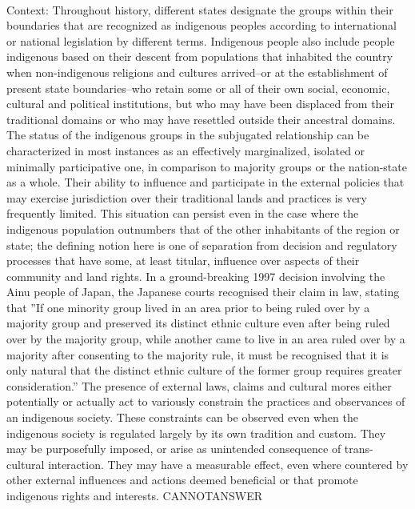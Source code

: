 \documentclass[11pt,a4paper, onecolumn]{article}
\begin{document}
\\ Context: Throughout history, different states designate the groups within their boundaries that are recognized as indigenous peoples according to international or national legislation by different terms. Indigenous people also include people indigenous based on their descent from populations that inhabited the country when non-indigenous religions and cultures arrived--or at the establishment of present state boundaries--who retain some or all of their own social, economic, cultural and political institutions, but who may have been displaced from their traditional domains or who may have resettled outside their ancestral domains. The status of the indigenous groups in the subjugated relationship can be characterized in most instances as an effectively marginalized, isolated or minimally participative one, in comparison to majority groups or the nation-state as a whole. Their ability to influence and participate in the external policies that may exercise jurisdiction over their traditional lands and practices is very frequently limited. This situation can persist even in the case where the indigenous population outnumbers that of the other inhabitants of the region or state; the defining notion here is one of separation from decision and regulatory processes that have some, at least titular, influence over aspects of their community and land rights. In a ground-breaking 1997 decision involving the Ainu people of Japan, the Japanese courts recognised their claim in law, stating that ''If one minority group lived in an area prior to being ruled over by a majority group and preserved its distinct ethnic culture even after being ruled over by the majority group, while another came to live in an area ruled over by a majority after consenting to the majority rule, it must be recognised that it is only natural that the distinct ethnic culture of the former group requires greater consideration.'' The presence of external laws, claims and cultural mores either potentially or actually act to variously constrain the practices and observances of an indigenous society. These constraints can be observed even when the indigenous society is regulated largely by its own tradition and custom. They may be purposefully imposed, or arise as unintended consequence of trans-cultural interaction. They may have a measurable effect, even where countered by other external influences and actions deemed beneficial or that promote indigenous rights and interests. CANNOTANSWER
\end{document}
